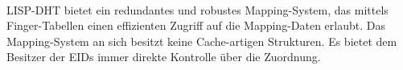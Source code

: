 \paragraph{}
LISP-DHT bietet ein redundantes und robustes Mapping-System, das mittels Finger-Tabellen einen effizienten Zugriff auf die Mapping-Daten erlaubt. Das Mapping-System an sich besitzt keine Cache-artigen Strukturen. Es bietet dem Besitzer der EIDs immer direkte Kontrolle über die Zuordnung.



